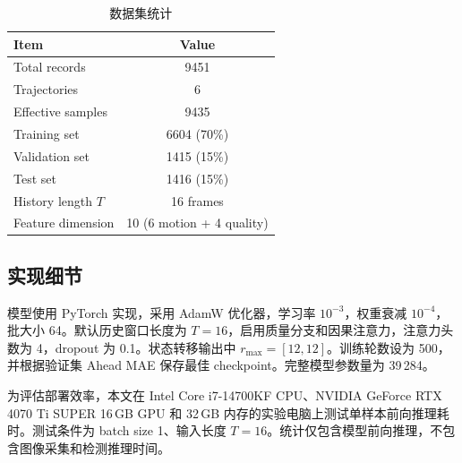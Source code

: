 \documentclass[journal]{IEEEtran}
\begin{document}
\begin{table}[!t]
\centering
\caption{数据集统计}
\label{tab:dataset}
\begin{tabular}{lc}
\toprule
\textbf{Item} & \textbf{Value} \\
\midrule
Total records & 9451 \\
Trajectories & 6 \\
Effective samples & 9435 \\
Training set & 6604 (70\%) \\
Validation set & 1415 (15\%) \\
Test set & 1416 (15\%) \\
History length $T$ & 16 frames \\
Feature dimension & 10 (6 motion + 4 quality) \\
\bottomrule
\end{tabular}
\end{table}

\subsection{实现细节}
模型使用 PyTorch 实现，采用 AdamW 优化器，学习率 $10^{-3}$，权重衰减 $10^{-4}$，批大小 64。默认历史窗口长度为 $T=16$，启用质量分支和因果注意力，注意力头数为 4，dropout 为 0.1。状态转移输出中 $r_{\max}=[12,12]$。训练轮数设为 500，并根据验证集 Ahead MAE 保存最佳 checkpoint。完整模型参数量为 39\,284。

为评估部署效率，本文在 Intel Core i7-14700KF CPU、NVIDIA GeForce RTX 4070 Ti SUPER 16\,GB GPU 和 32\,GB 内存的实验电脑上测试单样本前向推理耗时。测试条件为 batch size 1、输入长度 $T=16$。统计仅包含模型前向推理，不包含图像采集和检测推理时间。
\end{document}
